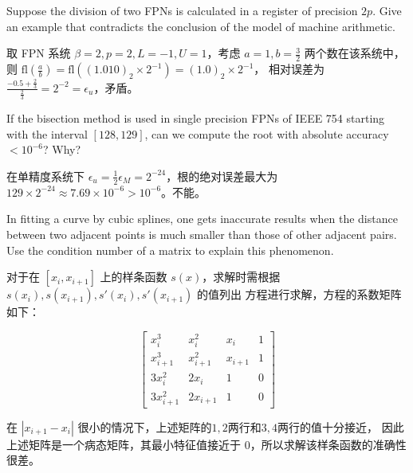 \documentclass[lang=cn,a4paper,newtx,bibend=bibtex]{elegantpaper}
\begin{document}
\begin{prob}
  Suppose the division of two FPNs is calculated in a register 
  of precision $2p$. Give an example that contradicts
  the conclusion of the model of machine arithmetic.
\end{prob}

\begin{solution}
  取 FPN 系统 $\beta = 2, p = 2, L = -1, U = 1$，考虑 $a = 1,b = \frac32$ 两个数在该系统中，
  则 $\text{fl}(\frac{a}b) = \text{fl}((1.010)_2\times 2^{-1}) = (1.0)_2\times 2^{-1}$，
  相对误差为 $\frac{-0.5 + \frac23}{\frac23} = 2^{-2} = \epsilon_u$，矛盾。
\end{solution}

\begin{prob}
  If the bisection method is used in single precision FPNs
  of IEEE 754 starting with the interval $[128, 129]$, can
  we compute the root with absolute accuracy $< 10^{−6}$?
  Why?
\end{prob}

\begin{solution}
  在单精度系统下 $\epsilon_u = \frac12\epsilon_M = 2^{-24}$，根的绝对误差最大为 $129 \times 2^{-24} \approx 7.69 \times 10^{-6} > 10^{-6}$。不能。
\end{solution}

\begin{prob}
  In fitting a curve by cubic splines, one gets inaccurate
  results when the distance between two adjacent points
  is much smaller than those of other adjacent pairs. Use
  the condition number of a matrix to explain this phenomenon.
\end{prob}

\begin{solution}
  对于在 $[x_i, x_{i+1}]$ 上的样条函数 $s(x)$，求解时需根据 $s(x_i), s(x_{i+1}), s'(x_i), s'(x_{i+1})$ 的值列出
  方程进行求解，方程的系数矩阵如下：

  \begin{equation*}
    \begin{bmatrix}
      x_i^3 & x_i^2  & x_i & 1 \\
      x_{i+1}^3 & x_{i+1}^2 & x_{i+1} & 1 \\
      3x_i^2 & 2x_i & 1 & 0 \\
      3x_{i + 1}^2 & 2x_{i+1} & 1 & 0
    \end{bmatrix}
  \end{equation*}


  在 $|x_{i+1}-x_i|$ 很小的情况下，上述矩阵的$1,2$两行和$3,4$两行的值十分接近，
  因此上述矩阵是一个病态矩阵，其最小特征值接近于 $0$，所以求解该样条函数的准确性很差。

\end{solution}
\end{document}
